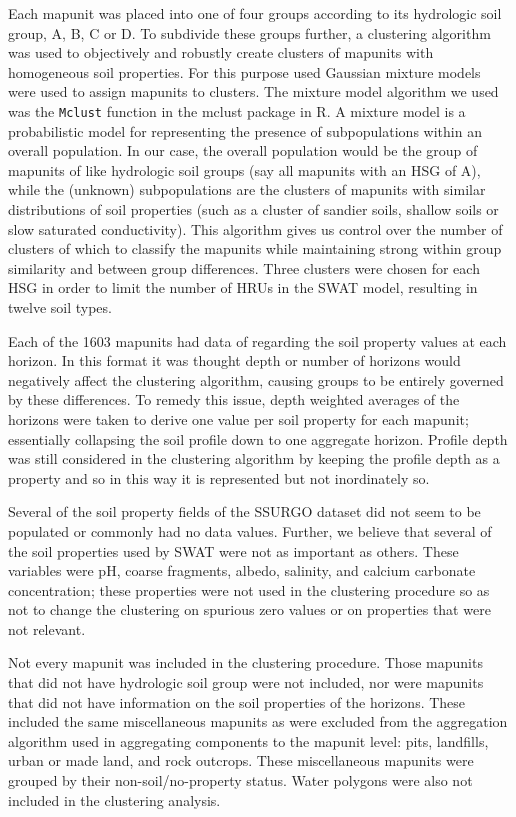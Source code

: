 \documentclass[10pt,letterpaper]{article}%
\begin{document}
		Each mapunit was placed into one of four groups according to its hydrologic soil group, A, B, C or D. To subdivide these groups further, a clustering algorithm was used to objectively and robustly create clusters of mapunits with homogeneous soil properties. For this purpose used Gaussian mixture models were used to assign mapunits to clusters. The mixture model algorithm we used was the \texttt{Mclust} function in the mclust package \citep{mclust_2012} in R. A mixture model is a probabilistic model for representing the presence of subpopulations within an overall population. In our case, the overall population would be the group of mapunits of like hydrologic soil groups (say all mapunits with an HSG of A), while the (unknown) subpopulations are the clusters of mapunits with similar distributions of soil properties (such as a cluster of sandier soils, shallow soils or slow saturated conductivity). This algorithm gives us control over the number of clusters of which to classify the mapunits while maintaining strong within group similarity and between group differences. Three clusters were chosen for each HSG in order to limit the number of HRUs in the SWAT model, resulting in twelve soil types.
		
		Each of the 1603 mapunits had data of regarding the soil property values at each horizon. In this format it was thought  depth or number of horizons would negatively affect the clustering algorithm, causing groups to be entirely governed by these differences. To remedy this issue, depth weighted averages of the horizons were taken to derive one value per soil property for each mapunit; essentially collapsing the soil profile down to one aggregate horizon. Profile depth was still considered in the clustering algorithm by keeping the profile depth as a property and so in this way it is represented but not inordinately so. 
		
		Several of the soil property fields of the SSURGO dataset did not seem to be populated or commonly had no data values. Further, we believe that several of the soil properties used by SWAT were not as important as others. These variables were pH, coarse fragments, albedo, salinity, and calcium carbonate concentration; these properties were not used in the clustering procedure so as not to change the clustering on spurious zero values or on properties that were not relevant. 
		
		Not every mapunit was included in the clustering procedure. Those mapunits that did not have hydrologic soil group were not included, nor were mapunits that did not have information on the soil properties of the horizons. These included the same miscellaneous mapunits as were excluded from the aggregation algorithm used in aggregating components to the mapunit level: pits, landfills, urban or made land, and rock outcrops. These miscellaneous mapunits were grouped by their non-soil/no-property status. Water polygons were also not included in the clustering analysis.
		
\end{document}
